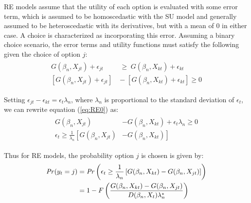 RE models assume that the utility of each option is evaluated with some error term, which is assumed to be homoscedastic with the SU model and generally assumed to be heteroscedastic with its derivatives, but with a mean of $0$ in either case.
A choice is characterized as incorporating this error.
Assuming a binary choice scenario, the error terms and utility functions must satisfy the following given the choice of option $j$:
\begin{align}
	\label{eq:RE0}
	\begin{split}
		G(\beta_n,X_{jt}) + \epsilon_{jt} \;&\geq\; G(\beta_n,X_{kt}) + \epsilon_{kt}\\
		\left[G(\beta_n,X_{jt}) + \epsilon_{jt}\right] \;&-\; \left[G(\beta_n,X_{kt}) + \epsilon_{kt}\right] \geq 0
	\end{split}
\end{align}

\noindent Setting $\epsilon_{jt} - \epsilon_{kt} = \epsilon_t\lambda_n$, where $\lambda_n$ is proportional to the standard deviation of $\epsilon_t$,{\footnotemark} we can rewrite equation (\ref{eq:RE0}) as:
\begin{align}
	\label{eq:RE1}
	\begin{split}
		G(\beta_n,X_{jt}) &- G(\beta_n,X_{kt}) + \epsilon_t\lambda_n \geq 0\\
		\epsilon_t \geq \frac{1}{\lambda_n} \left[ G(\beta_n,X_{jt}) \right.  &- \left. G(\beta_n,X_{kt}) \right]
	\end{split}
\end{align}

\addtocounter{footnote}{-1}

\noindent Thus for RE models, the probability option $j$ is chosen is given by:
\begin{align}
	\label{eq:RE.2}
	\begin{split}
	{\ensuremath{\mathit{Pr}}}(y_t = j) &= {\mathit{Pr}}\left(  \epsilon_t \geq \frac{1}{\lambda_n} \left[ G(\beta_n,X_{kt}) - G(\beta_n,X_{jt}) \right] \right)\\
	&= 1 - F\left( \dfrac{G(\beta_n,X_{kt}) - G(\beta_n,X_{jt})}{D(\beta_n,X_t)\lambda_n^* }  \right)
	\end{split}
\end{align}

